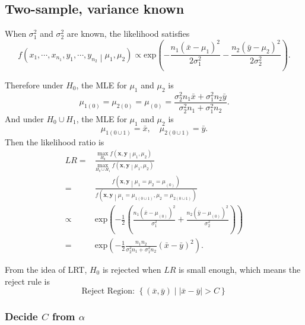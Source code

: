 \documentclass[a4paper,12pt]{article}
\begin{document}
\subsection{Two-sample, variance known}
\label{sec:two-sample-variance}
When $\sigma_1^2$ and $\sigma_2^2$ are known, the likelihood satisfies
\[
 f\left(x_1, \cdots, x_{n_1}, y_1, \cdots, y_{n_2}
   \middle|\mu_1, \mu_2\right)
 \propto
 \mathrm{exp}\left(
   -\frac{n_1\left(\bar{x} - \mu_1\right)^2}{2\sigma_1^2}
   -\frac{n_2\left(\bar{y} - \mu_2\right)^2}{2\sigma_2^2}
 \right)
 .
\]

Therefore under $H_0$, the MLE for $\mu_1$ and $\mu_2$ is
\[
  \mu_{1\left(0\right)} = \mu_{2\left(0\right)} = \mu_{\left(0\right)}
  = \frac{
    \sigma_2^2n_1\bar{x} + \sigma_1^2n_2\bar{y}
  }{
    \sigma_2^2n_1 + \sigma_1^2n_2
  }
  .
\]
And under $H_0\cup H_1$, the MLE for $\mu_1$ and $\mu_2$ is
\[
  \mu_{1\left(0\cup1\right)} = \bar{x}
  ,\quad
  \mu_{2\left(0\cup1\right)} = \bar{y}
  .
\]
Then the likelihood ratio is 
\[
  \begin{aligned}
    LR =& \frac{
            \underset{H_0}{\mathrm{max}}\;
            f\left(\bm{x}, \bm{y}\middle|\mu_1, \mu_2\right)
          }{
            \underset{H_0\cup H_1}{\mathrm{max}}\;
            f\left(\bm{x}, \bm{y}\middle|\mu_1, \mu_2\right)
          }    \\
    =& \frac{
       f\left(\bm{x}, \bm{y}\middle|\mu_1 = \mu_2 = \mu_{\left(0\right)}\right)
       }{
       f\left(\bm{x}, \bm{y}\middle|\mu_1 = \mu_{1\left(0\cup1\right)}, \mu_2 = \mu_{2\left(0\cup1\right)}\right)
       }    \\
    \propto&
             \mathrm{exp}\left(
               -\frac{1}{2}\left(
               \frac{n_1\left(\bar{x} - \mu_{\left(0\right)}\right)^2}{\sigma_1^2}
               +\frac{n_2\left(\bar{y} - \mu_{\left(0\right)}\right)^2}{\sigma_2^2}
               \right)
             \right)    \\
    =& \mathrm{exp}\left(
       -\frac{1}{2}
       \frac{n_1n_2}{\sigma_2^2n_1 + \sigma_1^2 n_2}
       \left(\bar{x} - \bar{y}\right)^2
       \right)
       .
  \end{aligned}
\]

From the idea of LRT, $H_0$ is rejected when $LR$ is small enough, which means the reject rule is
\[
  \text{Reject Region: }
  \left\{
    \left(\bar{x}, \bar{y}\right)
    \middle|
    \left|\bar{x} - \bar{y}\right| > C
  \right\}
\]

\subsubsection{Decide $C$ from $\alpha$}
\label{sec:decide-c-from-2}
\end{document}
